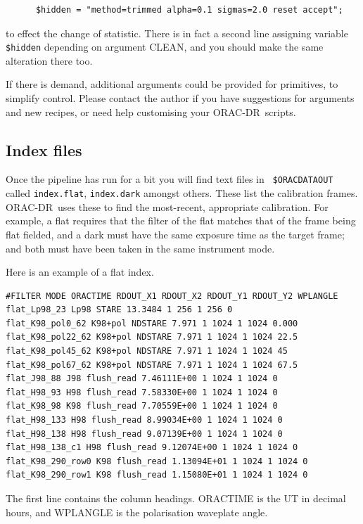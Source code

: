\documentclass[twoside,11pt]{article}
\newcommand{\xlabel}[1]{}
\renewcommand{\_}{\texttt{\symbol{95}}}
\newcommand{\ORACDR}{{\footnotesize ORAC-DR}}
\begin{document}
\begin{verbatim}
      $hidden = "method=trimmed alpha=0.1 sigmas=2.0 reset accept"; 
\end{verbatim}
to effect the change of statistic.  There is in fact a second line
assigning variable {\tt \$hidden} depending on argument CLEAN, and you
should make the same alteration there too.

If there is demand, additional arguments could be provided for
primitives, to simplify control.  Please contact the author if you
have suggestions for arguments and new recipes, or need help
customising your \ORACDR\ scripts.

\subsection{\xlabel{index_files}Index files\label{index_files}}

Once the pipeline has run for a bit you will find text files in {\tt
\$ORAC\_DATA\_OUT} called {\tt index.flat}, {\tt index.dark} amongst
others.  These list the calibration frames.  \ORACDR\ uses these to
find the most-recent, appropriate calibration.  For example, a flat
requires that the filter of the flat matches that of the frame being
flat fielded, and a dark must have the same exposure time as the
target frame; and both must have been taken in the same instrument
mode.

Here is an example of a flat index.

\begin{verbatim}
#FILTER MODE ORACTIME RDOUT_X1 RDOUT_X2 RDOUT_Y1 RDOUT_Y2 WPLANGLE
flat_Lp98_23 Lp98 STARE 13.3484 1 256 1 256 0
flat_K98_pol0_62 K98+pol NDSTARE 7.971 1 1024 1 1024 0.000
flat_K98_pol22_62 K98+pol NDSTARE 7.971 1 1024 1 1024 22.5
flat_K98_pol45_62 K98+pol NDSTARE 7.971 1 1024 1 1024 45
flat_K98_pol67_62 K98+pol NDSTARE 7.971 1 1024 1 1024 67.5
flat_J98_88 J98 flush_read 7.46111E+00 1 1024 1 1024 0
flat_H98_93 H98 flush_read 7.58330E+00 1 1024 1 1024 0
flat_K98_98 K98 flush_read 7.70559E+00 1 1024 1 1024 0
flat_H98_133 H98 flush_read 8.99034E+00 1 1024 1 1024 0
flat_H98_138 H98 flush_read 9.07139E+00 1 1024 1 1024 0
flat_H98_138_c1 H98 flush_read 9.12074E+00 1 1024 1 1024 0
flat_K98_290_row0 K98 flush_read 1.13094E+01 1 1024 1 1024 0
flat_K98_290_row1 K98 flush_read 1.15080E+01 1 1024 1 1024 0
\end{verbatim}
The first line contains the column headings.  ORACTIME is the UT in
decimal hours, and WPLANGLE is the polarisation waveplate angle.
\end{document}
